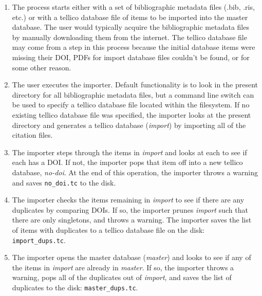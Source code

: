 \documentclass[letterpaper,12pt]{article}
\begin{document}
\begin{enumerate}
\item The process starts either with a set of bibliographic metadata files (.bib, .ris, etc.) or with a tellico database file of items to be imported into the master database. The user would typically acquire the bibliographic metadata files by manually downloading them from the internet. The tellico database file may come from a step in this process because the initial database items were missing their DOI, PDFs for import database files couldn't be found, or for some other reason.

\item The user executes the importer. Default functionality is to look in the present directory for all bibliographic metadata files, but a command line switch can be used to specify a tellico database file located within the filesystem. If no existing tellico database file was specified, the importer looks at the present directory and generates a tellico database (\emph{import}) by importing all of the citation files.

\item The importer steps through the items in \emph{import} and looks at each to see if each has a DOI. If not, the importer pops that item off into a new tellico database, \emph{no-doi}. At the end of this operation, the importer throws a warning and saves \verb|no_doi.tc| to the disk. 

\item The importer checks the items remaining in \emph{import} to see if there are any duplicates by comparing DOIs. If so, the importer prunes \emph{import} such that there are only singletons, and throws a warning. The importer saves the list of items with duplicates to a tellico database file on the disk: \verb|import_dups.tc|. 

\item The importer opens the master database (\emph{master}) and looks to see if any of the items in \emph{import} are already in \emph{master}. If so, the importer throws a warning, pops all of the duplicates out of \emph{import}, and saves the list of duplicates to the disk: \verb|master_dups.tc|.


\end{enumerate}
\end{document}
